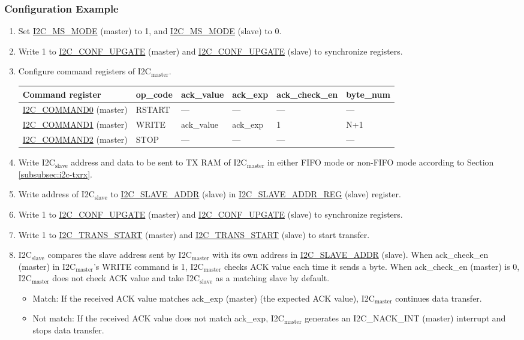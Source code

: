 \documentclass[main\_\_EN.tex]{subfiles}
\begin{document}
\subsubsection{Configuration Example}
\begin{enumerate}

\item Set \hyperref[fielddesc:I2CMSMODE]{I2C\_MS\_MODE} (master) to 1, and \hyperref[fielddesc:I2CMSMODE]{I2C\_MS\_MODE} (slave) to 0.
\item Write 1 to \hyperref[fielddesc:I2CCONFUPGATE]{I2C\_CONF\_UPGATE} (master) and \hyperref[fielddesc:I2CCONFUPGATE]{I2C\_CONF\_UPGATE} (slave) to synchronize registers.
\item Configure command registers of I2C$_\text{master}$.
\begin{longtable}{ | p{4cm} | p{2cm} | p{2cm} | p{2cm} |p{2cm} | p{2cm} |}
\hline\rowcolor{lightgray}
Command register& op\_code & ack\_value&ack\_exp&ack\_check\_en&byte\_num  \\ \hline
\hyperref[fielddesc:I2CCOMMAND0]{I2C\_COMMAND0} (master)& RSTART& ---&---&---&---  \\ \hline
\hyperref[fielddesc:I2CCOMMAND1]{I2C\_COMMAND1} (master)& WRITE& ack\_value&ack\_exp&1&N+1  \\ \hline
\hyperref[fielddesc:I2CCOMMAND2]{I2C\_COMMAND2} (master)& STOP& ---&---&---&---  \\ \hline
\end{longtable}
\item Write I2C$_\text{slave}$ address and data to be sent to TX RAM of I2C$_\text{master}$ in either FIFO mode or non-FIFO mode according to Section \ref{subsubsec:i2c-txrx}.
\item Write address of I2C$_\text{slave}$ to \hyperref[fielddesc:I2CSLAVEADDR]{I2C\_SLAVE\_ADDR} (slave) in \hyperref[regdesc:I2CSLAVEADDRREG]{I2C\_SLAVE\_ADDR\_REG} (slave) register.
\item Write 1 to \hyperref[fielddesc:I2CCONFUPGATE]{I2C\_CONF\_UPGATE} (master) and \hyperref[fielddesc:I2CCONFUPGATE]{I2C\_CONF\_UPGATE} (slave) to synchronize registers.
\item Write 1 to \hyperref[fielddesc:I2CTRANSSTART]{I2C\_TRANS\_START} (master) and \hyperref[fielddesc:I2CTRANSSTART]{I2C\_TRANS\_START} (slave) to start transfer.
\item I2C$_\text{slave}$ compares the slave address sent by I2C$_\text{master}$ with its own address in \hyperref[fielddesc:I2CSLAVEADDR]{I2C\_SLAVE\_ADDR} (slave). When ack\_check\_en (master) in I2C$_\text{master}$'s WRITE command is 1, I2C$_\text{master}$ checks ACK value each time it sends a byte. When ack\_check\_en (master) is 0, I2C$_\text{master}$ does not check ACK value and take I2C$_\text{slave}$ as a matching slave by default.
\begin{itemize}
\item Match: If the received ACK value matches ack\_exp (master) (the expected ACK value), I2C$_\text{master}$ continues data transfer.
\item Not match: If the received ACK value does not match ack\_exp, I2C$_\text{master}$ generates an I2C\_NACK\_INT (master) interrupt and stops data transfer.
\end{itemize}


\end{enumerate}
\end{document}
